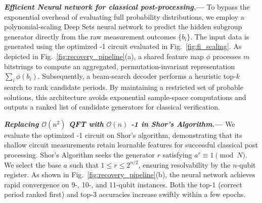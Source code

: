 \documentclass[reprint, aps, prl, superscriptaddress]{revtex4-2}
\renewcommand{\section}[1]{\par\medskip\noindent\textbf{{\textit{#1.}---}}}
\newcommand{\myqc}{\text{HP}}
\begin{document}
\section{Efficient Neural network for classical post-processing}
To bypass the exponential overhead of evaluating full probability distributions, we employ a polynomial-scaling Deep Sets neural network \cite{zaheer2017deep, edwards2016towards} to predict the hidden subgroup generator directly from the raw measurement outcomes $\{b_i\}$. The input data is generated using the optimized \myqc{}-1 circuit evaluated in Fig.~\ref{fig:fi_scaling}. As depicted in Fig.~\ref{fig:recovery_pipeline}(a), a shared feature map $\phi$ processes $m$ bitstrings to compute an aggregated, permutation-invariant representation $\sum_i\phi(b_i)$. Subsequently, a beam-search decoder \cite{sutskever2014sequence, wiseman2016sequence} performs a heuristic top-$k$ search to rank candidate periods. By maintaining a restricted set of probable solutions, this architecture avoids exponential sample-space computations and outputs a ranked list of candidate generators for classical verification.

\section{Replacing \texorpdfstring{$\mathcal{O}(n^2)$}{O(n2)} QFT with \texorpdfstring{$\mathcal{O}(n)$}{O(n)} \myqc{}-1 in Shor's Algorithm}
We evaluate the optimized \myqc{}-1 circuit on Shor's algorithm, demonstrating that its shallow circuit measurements retain learnable features for successful classical post processing. Shor's Algorithm seeks the generator $r$ satisfying $a^r \equiv 1 \pmod{N}$. We select the base $a$ such that $1 \le r \le 2^{n/2}$, ensuring resolvability by the $n$-qubit register. As shown in Fig.~\ref{fig:recovery_pipeline}(b), the neural network achieves rapid convergence on 9-, 10-, and 11-qubit instances. Both the top-1 (correct period ranked first) and top-3 accuracies increase swiftly within a few epochs.
\end{document}
